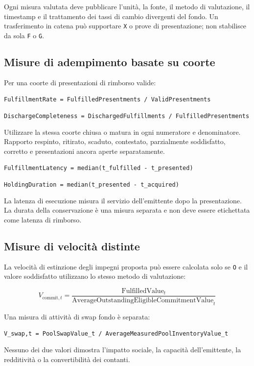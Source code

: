 \documentclass[11pt]{article}
\begin{document}
Ogni misura valutata deve pubblicare l'unità, la fonte, il metodo di valutazione, il timestamp e il trattamento dei tassi di cambio divergenti del fondo. Un trasferimento in catena può supportare \texttt{X} o prove di presentazione; non stabilisce da sola \texttt{F} o \texttt{G}.

\subsection*{Misure di adempimento basate su coorte}

Per una coorte di presentazioni di rimborso valide:

\texttt{FulfillmentRate = FulfilledPresentments / ValidPresentments}

\texttt{DischargeCompleteness = DischargedFulfillments / FulfilledPresentments}

Utilizzare la stessa coorte chiusa o matura in ogni numeratore e denominatore. Rapporto respinto, ritirato, scaduto, contestato, parzialmente soddisfatto, corretto e presentazioni ancora aperte separatamente.

\texttt{FulfillmentLatency = median(t\_fulfilled - t\_presented)}

\texttt{HoldingDuration = median(t\_presented - t\_acquired)}

La latenza di esecuzione misura il servizio dell'emittente dopo la presentazione. La durata della conservazione è una misura separata e non deve essere etichettata come latenza di rimborso.

\subsection*{Misure di velocità distinte}

La velocità di estinzione degli impegni proposta può essere calcolata solo se \texttt{O} e il valore soddisfatto utilizzano lo stesso metodo di valutazione:

\[
V_{\mathrm{commit},t} = \frac{\mathrm{FulfilledValue}_t}{\mathrm{AverageOutstandingEligibleCommitmentValue}_t}
\]

Una misura di attività di swap fondo è separata:

\texttt{V\_swap,t = PoolSwapValue\_t / AverageMeasuredPoolInventoryValue\_t}

Nessuno dei due valori dimostra l'impatto sociale, la capacità dell'emittente, la redditività o la convertibilità dei contanti.
\end{document}
